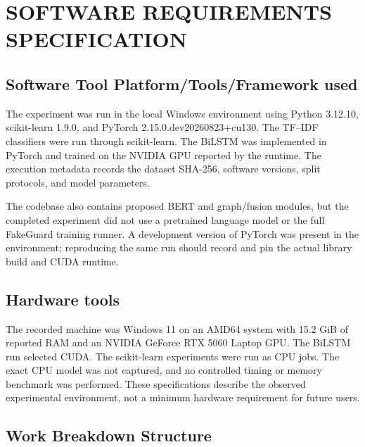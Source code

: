 \documentclass[12pt,a4paper]{report}
\begin{document}
\chapter{SOFTWARE REQUIREMENTS SPECIFICATION}

\section{Software Tool Platform/Tools/Framework used}

The experiment was run in the local Windows environment using Python 3.12.10, scikit-learn 1.9.0, and PyTorch 2.15.0.dev20260823+cu130. The TF--IDF classifiers were run through scikit-learn. The BiLSTM was implemented in PyTorch and trained on the NVIDIA GPU reported by the runtime. The execution metadata records the dataset SHA-256, software versions, split protocols, and model parameters.

The codebase also contains proposed BERT and graph/fusion modules, but the completed experiment did not use a pretrained language model or the full FakeGuard training runner. A development version of PyTorch was present in the environment; reproducing the same run should record and pin the actual library build and CUDA runtime.

\section{Hardware tools}

The recorded machine was Windows 11 on an AMD64 system with 15.2 GiB of reported RAM and an NVIDIA GeForce RTX 5060 Laptop GPU. The BiLSTM run selected CUDA. The scikit-learn experiments were run as CPU jobs. The exact CPU model was not captured, and no controlled timing or memory benchmark was performed. These specifications describe the observed experimental environment, not a minimum hardware requirement for future users.

\section{Work Breakdown Structure}
\end{document}
